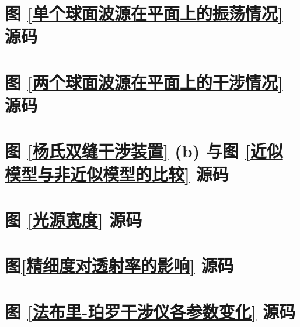 \documentclass[UTF8]{report}
\theoremstyle{MyLineTheoremStyle} %
\theoremstyle{MyBlockTheoremStyle} %
\theoremstyle{MySubsubsectionStyle} %
\begin{document}
\section{图 \ref{单个球面波源在平面上的振荡情况} 源码}
\label{单个球面波源在平面上的振荡情况 源码}


\section{图 \ref{两个球面波源在平面上的干涉情况} 源码}
\label{两个球面波源在平面上的干涉情况 源码}



\section{图 \ref{杨氏双缝干涉装置} (b) 与图 \ref{近似模型与非近似模型的比较} 源码}\label{杨氏双缝干涉装置 源码}


\section{图 \ref{光源宽度} 源码}
\label{光源宽度 源码}


\section{图\ref{精细度对透射率的影响} 源码}
\label{精细度对透射率的影响 源码}


\section{图 \ref{法布里-珀罗干涉仪各参数变化} 源码}
\label{法布里-珀罗干涉仪各参数变化 源码}


\end{document}
